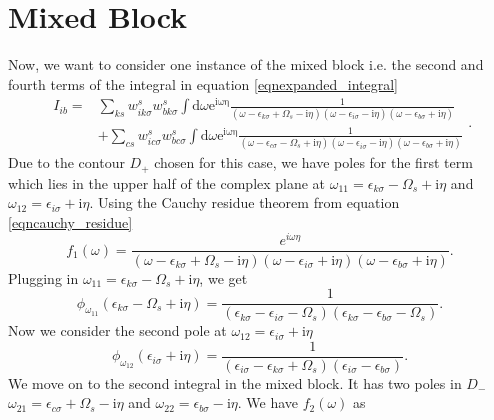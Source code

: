 \documentclass[12pt]{caltech_thesis}
\begin{document}
\section{Mixed Block}
Now, we want to consider one instance of the mixed block i.e. the second and fourth terms of the integral in equation \ref{eqnexpanded_integral}
\begin{equation}
\begin{aligned}
I_{ib} =& \sum_{ks} w_{i k \sigma}^s w_{b k \sigma}^s \int \mathrm{d} \omega \mathrm{e}^{\mathrm{i \omega \eta}} \frac{1}{(\omega-\epsilon_{k \sigma}+\Omega_s-\mathrm{i} \eta)(\omega-\epsilon_{i \sigma}-\mathrm{i} \eta)(\omega-\epsilon_{b \sigma}+\mathrm{i} \eta)}\\
& + \sum_{cs} w_{i c \sigma}^s w_{b c \sigma}^s \int \mathrm{d} \omega \mathrm{e}^{\mathrm{i \omega \eta}} \frac{1}{(\omega-\epsilon_{c \sigma}-\Omega_s+\mathrm{i} \eta)(\omega-\epsilon_{i \sigma}-\mathrm{i} \eta)(\omega-\epsilon_{b \sigma}+\mathrm{i} \eta)}
\end{aligned}
.
\end{equation}
Due to the contour $D_+$ chosen for this case, we have poles for the first term which lies in the upper half of the complex plane at $\omega_{11} = \epsilon _{k \sigma } - \Omega_s + \mathrm{i} \eta$ and $\omega_{12} = \epsilon _{i \sigma } + \mathrm{i} \eta$.
Using the Cauchy residue theorem from equation \ref{eqncauchy_residue}
\begin{equation}
f_1(\omega) = \frac{e^{i\omega \eta }}{(\omega-\epsilon_{k \sigma}+\Omega_s-\mathrm{i} \eta)(\omega-\epsilon_{i \sigma}+\mathrm{i} \eta)(\omega-\epsilon_{b \sigma}+\mathrm{i} \eta)}.
\end{equation}
Plugging in $\omega_{11} = \epsilon _{k \sigma } - \Omega_s + \mathrm{i} \eta$, we get
\begin{equation}
\phi_{\omega_{11}}(\epsilon_{k \sigma } - \Omega_s + \mathrm{i} \eta) = \frac{1}{(\epsilon_{k \sigma} -\epsilon_{i \sigma}-\Omega_s)(\epsilon_{k \sigma} -\epsilon_{b \sigma}-\Omega_s)}.
\end{equation}
Now we consider the second pole at $\omega_{12} = \epsilon _{i \sigma } + \mathrm{i} \eta$
\begin{equation}
\phi_{\omega_{12}}(\epsilon_{i \sigma} + \mathrm{i} \eta) = \frac{1}{(\epsilon_{i \sigma} -\epsilon_{k \sigma}+\Omega_s)(\epsilon_{i \sigma} -\epsilon_{b \sigma})}.
\end{equation}
We move on to the second integral in the mixed block. It has two poles in $D_-$ $\omega_{21} = \epsilon _{c\sigma } + \Omega_s - \mathrm{i} \eta$ and $\omega_{22} = \epsilon _{b \sigma } - \mathrm{i} \eta$. We have $f_2(\omega)$ as
\end{document}
